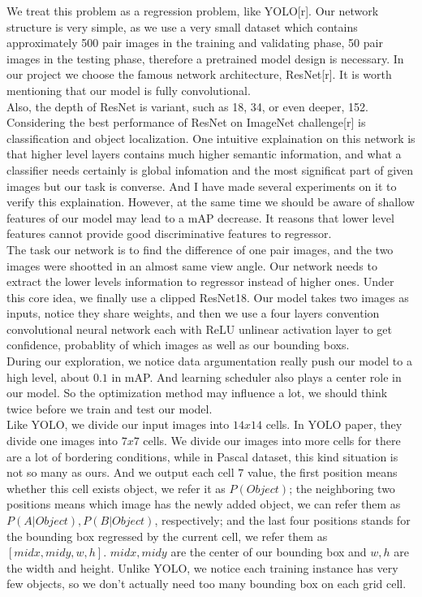 \documentclass[12pt]{article}
\begin{document}
We treat this problem as a regression problem, like YOLO[r]. Our network structure is very simple, as we use a very small dataset which contains approximately 500 pair images in the training and validating phase,  50 pair images in the testing phase, therefore a pretrained model design is necessary. In our project we choose the famous network architecture, ResNet[r]. It is worth mentioning that our model is fully convolutional.\\

Also, the depth of ResNet is variant, such as 18, 34, or even deeper, 152. Considering the best performance of ResNet on ImageNet challenge[r] is classification and object localization. One intuitive explaination on this network is that higher level layers contains much higher semantic information, and what a classifier needs certainly is global infomation and the most significat part of given images but our task is converse. And I have made several experiments on it to verify this explaination. However, at the same time we should be aware of shallow features of our model may lead to a mAP decrease. It reasons that lower level features cannot provide good discriminative features to regressor.\\

The task our network is to find the difference of one pair images, and the two images were shootted in an almost same view angle. Our network needs to extract the lower levels information to regressor instead of higher ones. Under this core idea, we finally use a clipped ResNet18. Our model takes two images as inputs, notice they share weights, and then we use a four layers convention convolutional neural network each with ReLU unlinear activation layer to get confidence, probablity of which images as well as our bounding boxs.\\

During our exploration, we notice data argumentation really push our model to a high level, about $0.1$ in mAP. And learning scheduler also plays a center role in our model. So the optimization method may influence a lot, we should think twice before we train and test our model.\\

Like YOLO, we divide our input images into $14x14$ cells. In YOLO paper, they divide one images into $7x7$ cells. We divide our images into more cells for there are a lot of bordering conditions, while in Pascal dataset, this kind situation is not so many as ours. And we output each cell $7$ value, the first position means whether this cell exists object, we refer it as $P(Object)$; the neighboring two positions means which image has the newly added object, we can refer them as $P(A|Object), P(B|Object)$, respectively; and the last four positions stands for the bounding box regressed by the current cell, we refer them as $[midx, midy, w, h]$. $midx, midy$ are the center of our bounding box and $w, h$ are the width and height. Unlike YOLO, we notice each training instance has very few objects, so we don't actually need too many bounding box on each grid cell.\\
\end{document}

